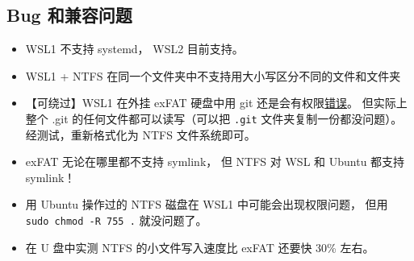 \subsection{Bug 和兼容问题}
\begin{itemize}
\item WSL1 不支持 systemd， WSL2 目前支持。
\item WSL1 + NTFS 在同一个文件夹中不支持用大小写区分不同的文件和文件夹
\item 【可绕过】WSL1 在外挂 exFAT 硬盘中用 git 还是会有权限\href{https://github.com/microsoft/WSL/issues/5179}{错误}。 但实际上整个 .git 的任何文件都可以读写（可以把 \verb|.git| 文件夹复制一份都没问题）。 经测试，重新格式化为 NTFS 文件系统即可。
\item  exFAT 无论在哪里都不支持 symlink， 但 NTFS 对 WSL 和 Ubuntu 都支持 symlink！
\item 用 Ubuntu 操作过的 NTFS 磁盘在 WSL1 中可能会出现权限问题， 但用 \verb|sudo chmod -R 755 .| 就没问题了。
\item 在 U 盘中实测 NTFS 的小文件写入速度比 exFAT 还要快 30\% 左右。
\end{itemize}
